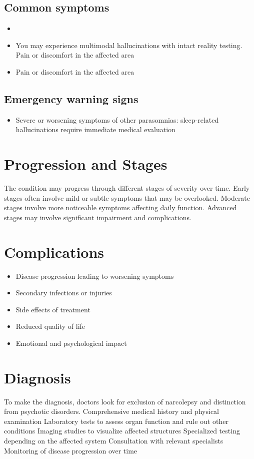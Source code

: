 \subsection{Common symptoms}
\begin{itemize}[noitemsep]
  \item \item You may experience multimodal hallucinations with intact reality testing. Pain or discomfort in the affected area    \item Pain or discomfort in the affected area
  \end{itemize}

\subsection{Emergency warning signs}
\begin{itemize}[noitemsep]
  \item Severe or worsening symptoms of other parasomnias: sleep-related hallucinations require immediate medical evaluation
\end{itemize}
\section{Progression and Stages}
The condition may progress through different stages of severity over time. Early stages often involve mild or subtle symptoms that may be overlooked. Moderate stages involve more noticeable symptoms affecting daily function. Advanced stages may involve significant impairment and complications.
\section{Complications}
\begin{itemize}[noitemsep]
  \item Disease progression leading to worsening symptoms
  \item Secondary infections or injuries
  \item Side effects of treatment
  \item Reduced quality of life
  \item Emotional and psychological impact
\end{itemize}
\section{Diagnosis}
To make the diagnosis, doctors look for exclusion of narcolepsy and distinction from psychotic disorders. Comprehensive medical history and physical examination Laboratory tests to assess organ function and rule out other conditions Imaging studies to visualize affected structures Specialized testing depending on the affected system Consultation with relevant specialists Monitoring of disease progression over time

